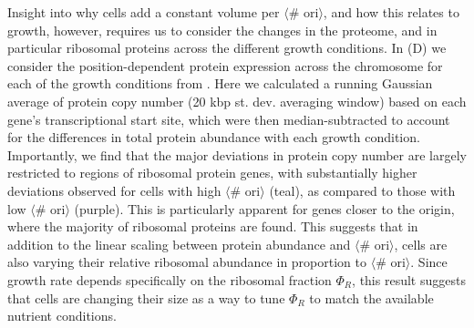 Insight into why cells add a constant volume per $\langle$\# ori$\rangle$, and
how this relates to growth, however, requires us to consider the changes in the
proteome, and in particular ribosomal proteins across the different growth
conditions. In (D) we consider the
position-dependent protein expression across the chromosome for each of the
growth conditions from \cite{schmidt2016}. Here we calculated a running
Gaussian average of protein copy number (20 kbp st. dev. averaging window) based on each gene's transcriptional start site, which were then
median-subtracted to account for the differences in total protein abundance with each
growth condition. Importantly, we find that the major deviations in protein copy
number are largely restricted to regions of ribosomal protein genes, with
substantially higher deviations observed for cells with high $\langle$\#
ori$\rangle$ (teal), as compared to those with low $\langle$\# ori$\rangle$
(purple). This is particularly apparent for genes closer to the origin, where
the majority of ribosomal proteins are found. This suggests that in addition
to the linear scaling between protein abundance and $\langle$\# ori$\rangle$,
cells are also varying their relative ribosomal abundance in proportion to
$\langle$\# ori$\rangle$. Since growth rate depends specifically on the
ribosomal fraction $\Phi_R$, this result suggests that cells are changing their
size as a way to tune $\Phi_R$ to match the available nutrient conditions.





